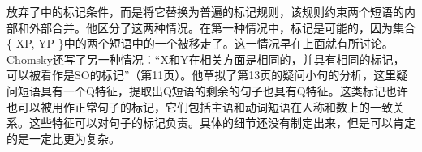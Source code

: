 \citet{Chomsky2013a}放弃了中的标记条件，而是将它替换为普遍的标记规则，该规则约束两个短语的内部和外部合并。他区分了这两种情况。在第一种情况中，标记是可能的，因为集合\{ XP, YP \}中的两个短语中的一个被移走了。这一情况早在上面就有所讨论。Chomsky还写了另一种情况：“X和Y在相关方面是相同的，并具有相同的标记，可以被看作是SO的标记”（第11页）。他草拟了第13页的疑问小句的分析，这里疑问短语具有一个Q特征，提取出Q短语的剩余的句子也具有Q特征。这类标记也许也可以被用作正常句子的标记，它们包括主语和动词短语在人称和数上的一致关系。这些特征可以对句子的标记负责。具体的细节还没有制定出来，但是可以肯定的是一定比更为复杂。


